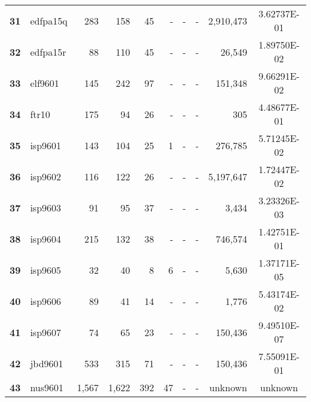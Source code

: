 \begin{longtable}{@{}llrrrrrrrc@{}}
\textbf{31} & edfpa15q & 283                  & 158      & 45      & -    & -    & -     & 2,910,473            & 3.62737E-01 \\
\textbf{32} & edfpa15r & 88                   & 110      & 45      & -    & -    & -     & 26,549               & 1.89750E-02 \\
\textbf{33} & elf9601  & 145                  & 242      & 97      & -    & -    & -     & 151,348              & 9.66291E-02 \\
\textbf{34} & ftr10    & 175                  & 94       & 26      & -    & -    & -     & 305                  & 4.48677E-01 \\
\textbf{35} & isp9601  & 143                  & 104      & 25      & 1    & -    & -     & 276,785              & 5.71245E-02 \\
\textbf{36} & isp9602  & 116                  & 122      & 26      & -    & -    & -     & 5,197,647            & 1.72447E-02 \\
\textbf{37} & isp9603  & 91                   & 95       & 37      & -    & -    & -     & 3,434                & 3.23326E-03 \\
\textbf{38} & isp9604  & 215                  & 132      & 38      & -    & -    & -     & 746,574              & 1.42751E-01 \\
\textbf{39} & isp9605  & 32                   & 40       & 8       & 6    & -    & -     & 5,630                & 1.37171E-05 \\
\textbf{40} & isp9606  & 89                   & 41       & 14      & -    & -    & -     & 1,776                & 5.43174E-02 \\
\textbf{41} & isp9607  & 74                   & 65       & 23      & -    & -    & -     & 150,436              & 9.49510E-07 \\
\textbf{42} & jbd9601  & 533                  & 315      & 71      & -    & -    & -     & 150,436              & 7.55091E-01 \\
\textbf{43} & nus9601  & 1,567                & 1,622    & 392     & 47   & -    & -     & unknown              & unknown     \\* \bottomrule
\end{longtable}
